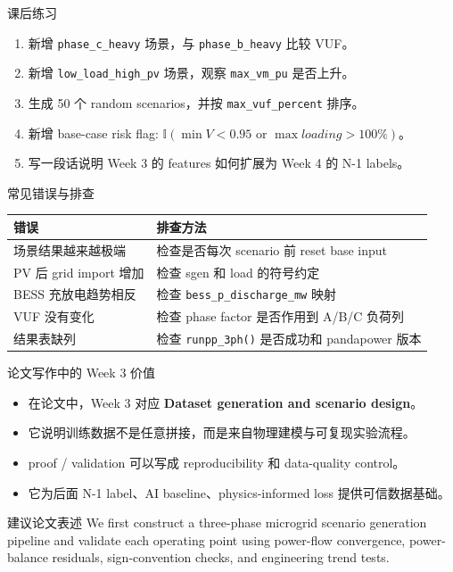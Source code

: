 \documentclass[aspectratio=169,11pt]{beamer}
\begin{document}
\begin{frame}{课后练习}
\begin{enumerate}
  \item 新增 \texttt{phase\_c\_heavy} 场景，与 \texttt{phase\_b\_heavy} 比较 VUF。
  \item 新增 \texttt{low\_load\_high\_pv} 场景，观察 \texttt{max\_vm\_pu} 是否上升。
  \item 生成 50 个 random scenarios，并按 \texttt{max\_vuf\_percent} 排序。
  \item 新增 base-case risk flag: \(\mathbb{I}(\min V <0.95 \text{ or } \max loading>100\%)\)。
  \item 写一段话说明 Week 3 的 features 如何扩展为 Week 4 的 N-1 labels。
\end{enumerate}
\end{frame}

\begin{frame}{常见错误与排查}
\begin{table}
\centering
\scriptsize
\begin{tabular}{p{}p{}}
\toprule
错误 & 排查方法 \\
\midrule
场景结果越来越极端 & 检查是否每次 scenario 前 reset base input \\
PV 后 grid import 增加 & 检查 sgen 和 load 的符号约定 \\
BESS 充放电趋势相反 & 检查 \texttt{bess\_p\_discharge\_mw} 映射 \\
VUF 没有变化 & 检查 phase factor 是否作用到 A/B/C 负荷列 \\
结果表缺列 & 检查 \texttt{runpp\_3ph()} 是否成功和 pandapower 版本 \\
\bottomrule
\end{tabular}
\end{table}
\end{frame}

\begin{frame}{论文写作中的 Week 3 价值}
\begin{itemize}
  \item 在论文中，Week 3 对应 \textbf{Dataset generation and scenario design}。
  \item 它说明训练数据不是任意拼接，而是来自物理建模与可复现实验流程。
  \item proof / validation 可以写成 reproducibility 和 data-quality control。
  \item 它为后面 N-1 label、AI baseline、physics-informed loss 提供可信数据基础。
\end{itemize}
\begin{block}{建议论文表述}
We first construct a three-phase microgrid scenario generation pipeline and validate each operating point using power-flow convergence, power-balance residuals, sign-convention checks, and engineering trend tests.
\end{block}
\end{frame}
\end{document}

